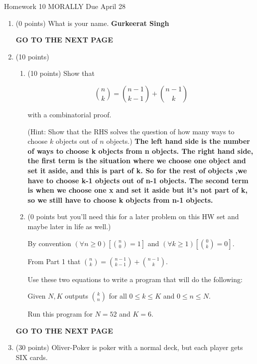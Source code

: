 \documentclass[12pt]{article}
\begin{document}
\centerline{Homework 10  MORALLY Due April 28} 


\begin{enumerate}
\item
(0 points)
What is your name.
\textbf{Gurkeerat Singh}

\vfill 

\centerline{\bf GO TO THE NEXT PAGE}

\newpage

\item
(10 points) 

\begin{enumerate}
\item 
(10 points) 
Show that 

$$\binom{n}{k} = \binom{n-1}{k-1} + \binom{n-1}{k}$$

with a combinatorial proof. 

(Hint: Show that the RHS solves the question of how many ways to choose $k$ objects
out of $n$ objects.) 
\textbf{The left hand side is the number of ways to choose k objects from n objects. The right hand side, the first term is the situation where we choose one object and set it aside, and this is part of k. So for the rest of objects ,we have to choose k-1 objects out of n-1 objects. The second term is when we choose one x and set it aside but it's not part of k, so we still have to choose k objects from n-1 objects. }

\item
(0 points but you'll need this for a later problem on this HW set
and maybe later in life as well.) 

By convention $(\forall n\ge 0)[\binom{n}{0}=1]$ and  $(\forall k\ge 1)[\binom{0}{k}=0]$.

From Part 1 that $\binom{n}{k} = \binom{n-1}{k-1} + \binom{n-1}{k}$.

Use these two equations to write a program that will do the following:

Given $N,K$ outputs $\binom{k}{n}$ for all $0\le k\le K$ and $0\le n\le N$. 

Run this program for $N=52$ and $K=6$. 

\end{enumerate}

\vfill 

\centerline{\bf GO TO THE NEXT PAGE}

\newpage


\item 
(30 points) 
Oliver-Poker is poker with a normal deck, but 
each player gets SIX cards.


\end{enumerate}
\end{document}
